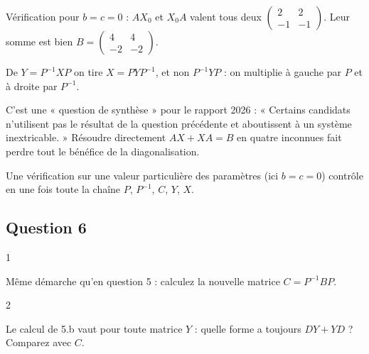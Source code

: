\documentclass[11pt,a4paper]{article}
\begin{document}
Vérification pour \(b=c=0\) : \(AX_0\) et \(X_0A\) valent tous deux \(\begin{pmatrix}2&2\\-1&-1\end{pmatrix}\). Leur somme est bien \(B=\begin{pmatrix}4&4\\-2&-2\end{pmatrix}\).

\begin{piege}

De \(Y=P^{-1}XP\) on tire \(X=PYP^{-1}\), et non \(P^{-1}YP\) : on multiplie à gauche par \(P\) et à droite par \(P^{-1}\).

\end{piege}

\begin{jury}

C'est une « question de synthèse » pour le rapport 2026 : « Certains candidats n'utilisent pas le résultat de la question précédente et aboutissent à un système inextricable. » Résoudre directement \(AX+XA=B\) en quatre inconnues fait perdre tout le bénéfice de la diagonalisation.

\end{jury}

\begin{methode}

Une vérification sur une valeur particulière des paramètres (ici \(b=c=0\)) contrôle en une fois toute la chaîne \(P\), \(P^{-1}\), \(C\), \(Y\), \(X\).

\end{methode}

\hypertarget{question-6}{%
\subsection{Question 6}\label{question-6}}

\begin{indication}{1}

Même démarche qu'en question 5 : calculez la nouvelle matrice \(C=P^{-1}BP\).

\end{indication}

\begin{indication}{2}

Le calcul de 5.b vaut pour toute matrice \(Y\) : quelle forme a toujours \(DY+YD\) ? Comparez avec \(C\).

\end{indication}
\end{document}
